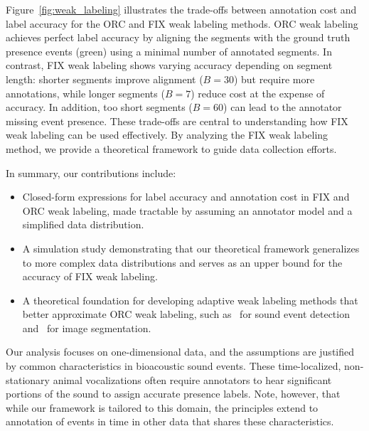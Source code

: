 Figure~\ref{fig:weak_labeling} illustrates the trade-offs between annotation cost and label accuracy for the ORC and FIX weak labeling methods. ORC weak labeling achieves perfect label accuracy by aligning the segments with the ground truth presence events (green) using a minimal number of annotated segments. In contrast, FIX weak labeling shows varying accuracy depending on segment length: shorter segments improve alignment ($B=30$) but require more annotations, while longer segments ($B=7$) reduce cost at the expense of accuracy. In addition, too short segments ($B=60$) can lead to the annotator missing event presence. These trade-offs are central to understanding how FIX weak labeling can be used effectively. By analyzing the FIX weak labeling method, we provide a theoretical framework to guide data collection efforts. 


In summary, our contributions include:
\begin{itemize}
\item Closed-form expressions for label accuracy and annotation cost in FIX and ORC weak labeling, made tractable by assuming an annotator model and a simplified data distribution.
\item A simulation study demonstrating that our theoretical framework generalizes to more complex data distributions and serves as an upper bound for the accuracy of FIX weak labeling.
\item A theoretical foundation for developing adaptive weak labeling methods that better approximate ORC weak labeling, such as~\citep{Martinsson2024} for sound event detection and~\citep{Kim2023} for image segmentation.
\end{itemize}

Our analysis focuses on one-dimensional data, and the assumptions are justified by common characteristics in bioacoustic sound events. These time-localized, non-stationary animal vocalizations often require annotators to hear significant portions of the sound to assign accurate presence labels. Note, however, that while our framework is tailored to this domain, the principles extend to annotation of events in time in other data that shares these characteristics.